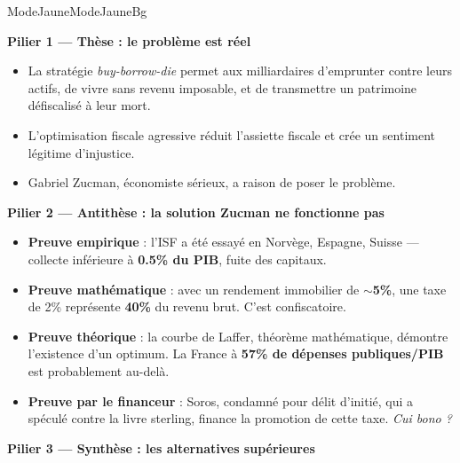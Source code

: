 \documentclass[a4paper,11pt]{article}
\newcommand{\stat}[1]{\textbf{\textcolor{ChapColor}{#1}}}
\begin{document}
\begin{fichemode}{ModeJaune}{ModeJauneBg}

\textbf{\textcolor{ModeJauneDark}{ Pilier 1 --- Th\`ese : le probl\`eme est r\'eel}}

\begin{itemize}[label=\textcolor{ModeJaune}{\textbullet}, itemsep=2pt]
  \item La strat\'egie \emph{buy-borrow-die} permet aux milliardaires d'emprunter contre leurs actifs, de vivre sans revenu imposable, et de transmettre un patrimoine d\'efiscalis\'e \`a leur mort.
  \item L'optimisation fiscale agressive r\'eduit l'assiette fiscale et cr\'ee un sentiment l\'egitime d'injustice.
  \item Gabriel Zucman, \'economiste s\'erieux, a raison de poser le probl\`eme.
\end{itemize}

\vspace{3mm}
\textbf{\textcolor{ModeJauneDark}{ Pilier 2 --- Antith\`ese : la solution Zucman ne fonctionne pas}}

\begin{itemize}[label=\textcolor{ModeJaune}{\textbullet}, itemsep=2pt]
  \item \textbf{Preuve empirique} : l'ISF a \'et\'e essay\'e en Norv\`ege, Espagne, Suisse --- collecte inf\'erieure \`a \stat{0.5\% du PIB}, fuite des capitaux.
  \item \textbf{Preuve math\'ematique} : avec un rendement immobilier de \stat{$\sim$5\%}, une taxe de 2\% repr\'esente \stat{40\%} du revenu brut. C'est confiscatoire.
  \item \textbf{Preuve th\'eorique} : la courbe de Laffer, th\'eor\`eme math\'ematique, d\'emontre l'existence d'un optimum. La France \`a \stat{57\% de d\'epenses publiques/PIB} est probablement au-del\`a.
  \item \textbf{Preuve par le financeur} : Soros, condamn\'e pour d\'elit d'initi\'e, qui a sp\'ecul\'e contre la livre sterling, finance la promotion de cette taxe. \emph{Cui bono ?}
\end{itemize}

\vspace{3mm}
\textbf{\textcolor{ModeJauneDark}{ Pilier 3 --- Synth\`ese : les alternatives sup\'erieures}}


\end{fichemode}
\end{document}
